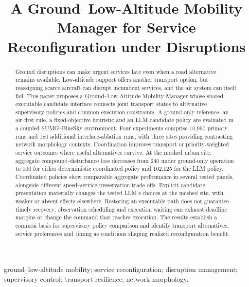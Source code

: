 \documentclass[]{interact}
\theoremstyle{plain}
\theoremstyle{definition}
\theoremstyle{remark}
\begin{document}

\title{A Ground--Low-Altitude Mobility Manager for Service Reconfiguration under Disruptions}

\author{
}

\maketitle

\begin{abstract}
Ground disruptions can make urgent services late even when a road alternative remains available. Low-altitude support offers another transport option, but reassigning scarce aircraft can disrupt incumbent services, and the air system can itself fail. This paper proposes a Ground--Low-Altitude Mobility Manager whose shared executable candidate interface connects joint transport states to alternative supervisory policies and common execution constraints. A ground-only reference, an air-first rule, a fixed-objective heuristic and an LLM-candidate policy are evaluated in a coupled SUMO--BlueSky environment. Four experiments comprise 10,960 primary runs and 180 additional interface-ablation runs, with three sites providing contrasting network morphology contexts. Coordination improves transport or priority-weighted service outcomes where useful alternatives survive. At the meshed urban site, aggregate compound-disturbance loss decreases from 240 under ground-only operation to 100 for either deterministic coordinated policy and 102.125 for the LLM policy. Coordinated policies show comparable aggregate performance in several tested panels, alongside different speed--service-preservation trade-offs. Explicit candidate presentation materially changes the tested LLM's choices at the meshed site, with weaker or absent effects elsewhere. Restoring an executable path does not guarantee timely recovery: observation scheduling and execution waiting can exhaust deadline margins or change the command that reaches execution. The results establish a common basis for supervisory policy comparison and identify transport alternatives, service preferences and timing as conditions shaping realized reconfiguration benefit.
\end{abstract}

\begin{keywords}
ground--low-altitude mobility; service reconfiguration; disruption management; supervisory control; transport resilience; network morphology.
\end{keywords}
\end{document}

